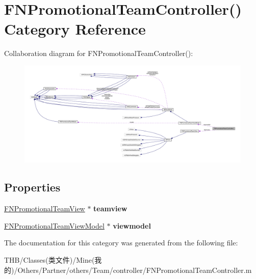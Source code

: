 \hypertarget{category_f_n_promotional_team_controller_07_08}{}\section{F\+N\+Promotional\+Team\+Controller() Category Reference}
\label{category_f_n_promotional_team_controller_07_08}


Collaboration diagram for F\+N\+Promotional\+Team\+Controller()\+:\nopagebreak
\begin{figure}[H]
\begin{center}
\leavevmode
\includegraphics[width=350pt]{category_f_n_promotional_team_controller_07_08__coll__graph}
\end{center}
\end{figure}
\subsection*{Properties}
\begin{DoxyCompactItemize}
\item 
\mbox{\label{category_f_n_promotional_team_controller_07_08_ae960c7a984a6c5e184377cd7eeb12db4}} 
\mbox{\hyperlink{interface_f_n_promotional_team_view}{F\+N\+Promotional\+Team\+View}} $\ast$ {\bfseries teamview}
\item 
\mbox{\label{category_f_n_promotional_team_controller_07_08_aa916a3ab2d17e7e118038d4addfc0883}} 
\mbox{\hyperlink{interface_f_n_promotional_team_view_model}{F\+N\+Promotional\+Team\+View\+Model}} $\ast$ {\bfseries viewmodel}
\end{DoxyCompactItemize}


The documentation for this category was generated from the following file\+:\begin{DoxyCompactItemize}
\item 
T\+H\+B/\+Classes(类文件)/\+Mine(我的)/\+Others/\+Partner/others/\+Team/controller/F\+N\+Promotional\+Team\+Controller.\+m\end{DoxyCompactItemize}
